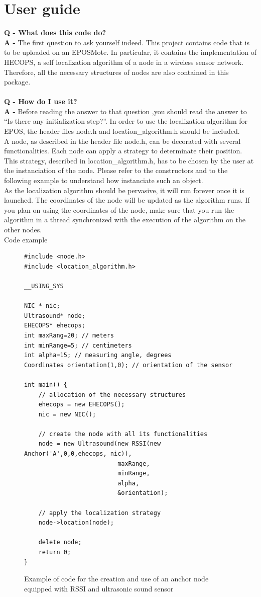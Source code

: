\documentclass[a4paper,10pt]{article}
\begin{document}
\section{User guide}
\textbf{Q - What does this code do?} \\
\textbf{A - }The first question to ask yourself indeed. This project contains code that is to be uploaded on an EPOSMote. In particular, it 
contains the implementation of HECOPS, a self localization algorithm of a node in a wireless sensor network. Therefore, all the necessary structures
of nodes are also contained in this package. 
\\ \\
\textbf{Q - How do I use it?}\\
\textbf{A - }Before reading the answer to that question ,you should read the answer to \textquotedblleft Is there any initialization
step?\textquotedblright.
In order to use the localization algorithm for EPOS, the header files node.h and location\_algorithm.h should be included. \\
A node, as described in the header file node.h, can be decorated with several functionalities. Each node can apply a strategy to determinate 
their position. This strategy, described in location\_algorithm.h, has to be chosen by the user at the instanciation of the node.
Please refer to the constructors and to the following example to understand how instanciate such an object. \\
As the localization algorithm should be pervasive, it will run forever once it is launched. The coordinates of the node will be updated
as the algorithm runs. If you plan on using the coordinates of the node, make sure that you run the algorithm in a thread synchronized
with the execution of the algorithm on the other nodes.\\
Code example
\begin{figure}[H]
\begin{verbatim}
#include <node.h>
#include <location_algorithm.h>

__USING_SYS

NIC * nic;
Ultrasound* node;
EHECOPS* ehecops;
int maxRang=20; // meters
int minRange=5; // centimeters
int alpha=15; // measuring angle, degrees
Coordinates orientation(1,0); // orientation of the sensor

int main() {
    // allocation of the necessary structures
    ehecops = new EHECOPS();
    nic = new NIC();
    
    // create the node with all its functionalities
    node = new Ultrasound(new RSSI(new Anchor('A',0,0,ehecops, nic)),
                          maxRange,
                          minRange,
                          alpha,
                          &orientation);

    // apply the localization strategy
    node->location(node);
    
    delete node;
    return 0;
}
\end{verbatim}
\caption{Example of code for the creation and use of an anchor node equipped with RSSI and ultrasonic sound sensor}
\end{figure}
\end{document}
